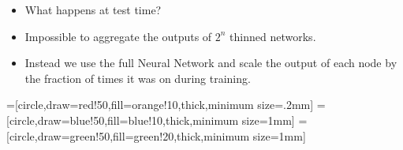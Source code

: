 \documentclass[serif,aspectratio=169]{beamer}
\begin{document}
\begin{frame}
	\begin{itemize}
		\item<2-> What happens at test time?
		\item<3-> Impossible to aggregate the outputs of $2^n$ thinned networks.
		\item<4-> Instead we use the full Neural Network and scale the output of each node by the fraction of times it was on during training.
	\end{itemize}
						
\end{frame}
				
\begin{frame}
	=[circle,draw=red!50,fill=orange!10,thick,minimum size=.2mm]
	=[circle,draw=blue!50,fill=blue!10,thick,minimum size=1mm]
	=[circle,draw=green!50,fill=green!20,thick,minimum size=1mm]
						

\end{frame}
\end{document}
